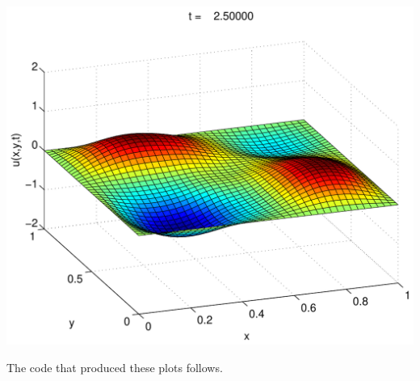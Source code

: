 {\begin{solution}
\begin{enumerate}
\begin{center}
\includegraphics[scale=0.37]{wave2d_5} 
\end{center}

\newpage
The code that produced these plots follows.


\end{enumerate}
\end{solution}}{}


